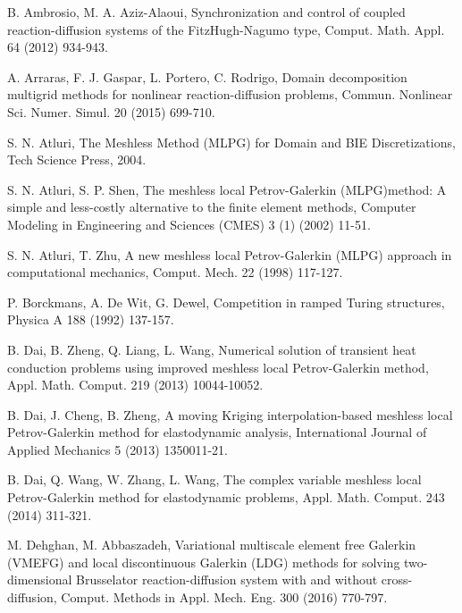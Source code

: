 \documentclass[12pt]{article}
\numberwithin{equation}{section}
\begin{document}
\begin{thebibliography}{99}

 B. Ambrosio, M. A. Aziz-Alaoui, Synchronization and control of coupled reaction-diffusion
systems of the FitzHugh-Nagumo type, Comput. Math. Appl. 64 (2012) 934-943.

 A. Arraras, F. J. Gaspar, L. Portero, C. Rodrigo, Domain decomposition multigrid methods for
nonlinear reaction-diffusion problems, Commun. Nonlinear Sci. Numer. Simul.  20 (2015) 699-710.

 S. N. Atluri, The Meshless Method (MLPG) for Domain and BIE Discretizations, Tech Science Press, 2004.

 S. N. Atluri, S. P. Shen, The meshless local Petrov-Galerkin (MLPG)method: A simple and less-costly alternative to the finite element methods, Computer Modeling in Engineering and Sciences (CMES) 3 (1) (2002) 11-51.

 S. N. Atluri, T. Zhu,  A new meshless local Petrov-Galerkin (MLPG)
approach in computational mechanics, Comput. Mech. 22 (1998)
117-127.

 P. Borckmans, A. De Wit, G. Dewel, Competition in ramped Turing structures, Physica A 188 (1992) 137-157.

 B. Dai, B. Zheng, Q. Liang, L. Wang,  Numerical solution of transient heat conduction problems using improved meshless local Petrov-Galerkin method, Appl. Math. Comput. 219 (2013) 10044-10052.

 B. Dai, J. Cheng, B. Zheng, A moving Kriging interpolation-based meshless local Petrov-Galerkin method for elastodynamic analysis, International Journal of Applied Mechanics 5 (2013) 1350011-21.

 B. Dai, Q. Wang, W. Zhang, L. Wang, The complex variable meshless local Petrov-Galerkin method for elastodynamic problems, Appl. Math. Comput. 243 (2014) 311-321.

 M. Dehghan, M. Abbaszadeh, Variational multiscale element free Galerkin (VMEFG) and local discontinuous Galerkin (LDG) methods for solving two-dimensional Brusselator reaction-diffusion system with and without cross-diffusion, Comput. Methods in Appl. Mech. Eng. 300 (2016) 770-797.



\end{thebibliography}
\end{document}
